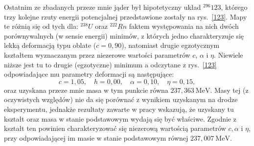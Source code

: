 \documentclass[a4paper,polish]{article}
\numberwithin{equation}{section}
\begin{document}
Ostatnim ze zbadanych przeze mnie jąder był hipotetyczny układ $^{296}123$, którego trzy kolejne rzuty energii potencjalnej przedstawione zostały na rys.~\ref{123}. Mapy te różnią się od tych dla: $^{238}U$ oraz $^{222}Rn$ faktem występowania na nich dwóch porównywalnych (w sensie energii) minimów, z których jedno charakteryzuje się lekką deformacją typu oblate ($c=0,90$), natomiast drugie egzotycznym kształtem wyznaczanym przez niezerowe wartości parametrów $c$, $\alpha$ i $\eta$. Niewiele niższe jest tu to drugie (egzotyczne) minimum a odczytane z rys.~\ref{123} odpowiadające mu parametry deformacji są następujące:
\begin{equation*}
c=1,05, \quad h= 0,00, \quad \alpha=0,10, \quad \eta= 0,15,
\end{equation*}
oraz uzyskana przeze mnie  masa w tym punkcie równa $237,363~\mathrm{MeV}$. Masy tej (z oczywistych względów) nie da się porównać z wynikiem uzyskanym na drodze eksperymentu, jednakże rezultaty zawarte w pracy \cite{A32} wskazują, że uzyskany tu kształt oraz masa w stanie podstawowym wydają się być właściwe. Zgodnie z \cite{A32} kształt ten powinien charakteryzować się niezerową wartością parametrów $c, \alpha$ i $\eta$, przy odpowiadającej im masie w stanie podstawowym równej $237,007~\mathrm{MeV}$. %
\end{document}
